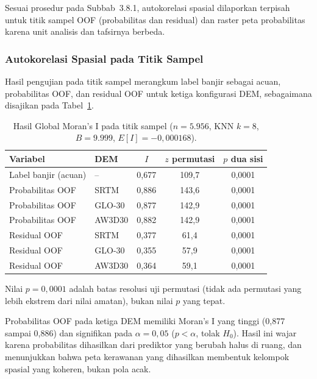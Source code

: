 \documentclass[12pt]{article}
\begin{document}
Sesuai prosedur pada Subbab~3.8.1, autokorelasi spasial dilaporkan terpisah
untuk titik sampel OOF (probabilitas dan residual) dan raster peta
probabilitas karena unit analisis dan tafsirnya berbeda.

\subsubsection{Autokorelasi Spasial pada Titik Sampel}

Hasil pengujian pada titik sampel merangkum label banjir sebagai acuan,
probabilitas OOF, dan residual OOF untuk ketiga konfigurasi DEM, sebagaimana
disajikan pada Tabel~\ref{tab:moran-oof}.

\begin{table}[ht]
\centering
\caption{Hasil Global Moran's I pada titik sampel ($n=5.956$, KNN $k=8$,
$B=9.999$, $E[I]=-0{,}000168$).}
\label{tab:moran-oof}
\begin{tabular}{llccc}
\toprule
\textbf{Variabel} & \textbf{DEM} & \textbf{$I$} & \textbf{$z$ permutasi} & \textbf{$p$ dua sisi} \\
\midrule
Label banjir (acuan) & --     & 0,677 & 109,7 & 0,0001 \\
Probabilitas OOF     & SRTM   & 0,886 & 143,6 & 0,0001 \\
Probabilitas OOF     & GLO-30 & 0,877 & 142,9 & 0,0001 \\
Probabilitas OOF     & AW3D30 & 0,882 & 142,9 & 0,0001 \\
Residual OOF         & SRTM   & 0,377 & 61,4  & 0,0001 \\
Residual OOF         & GLO-30 & 0,355 & 57,9  & 0,0001 \\
Residual OOF         & AW3D30 & 0,364 & 59,1  & 0,0001 \\
\bottomrule
\end{tabular}
\end{table}

Nilai $p=0{,}0001$ adalah batas resolusi uji permutasi (tidak ada permutasi
yang lebih ekstrem dari nilai amatan), bukan nilai $p$ yang tepat.

Probabilitas OOF pada ketiga DEM memiliki Moran's I yang tinggi (0,877 sampai
0,886) dan signifikan pada $\alpha=0{,}05$ ($p<\alpha$, tolak $H_0$). Hasil
ini wajar karena probabilitas dihasilkan dari prediktor yang berubah halus di
ruang, dan menunjukkan bahwa peta kerawanan yang dihasilkan membentuk
kelompok spasial yang koheren, bukan pola acak.
\end{document}
